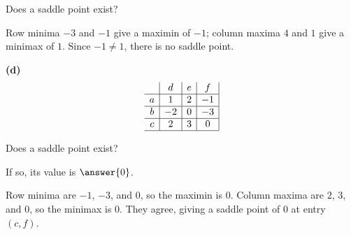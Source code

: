 \documentclass[12pt]{ximera}
\begin{document}
\begin{problem}
\begin{prompt}
Does a saddle point exist?
\begin{multipleChoice}
\end{multipleChoice}

\begin{solution}
Row minima $-3$ and $-1$ give a maximin of $-1$; column maxima $4$ and $1$ give a
minimax of $1$. Since $-1\neq 1$, there is no saddle point.
\end{solution}
\end{prompt}

\begin{prompt}
\textbf{(d)}
\[
\begin{array}{c|c|c|c|}
\phantom{|} & d & e & f \\\hline
a & 1 & 2 & -1 \\\hline
b & -2 & 0 & -3 \\\hline
c & 2 & 3 & 0 \\\hline
\end{array}
\]

Does a saddle point exist?
\begin{multipleChoice}
\end{multipleChoice}

If so, its value is $\answer{0}$.

\begin{solution}
Row minima are $-1$, $-3$, and $0$, so the maximin is $0$. Column maxima are $2$, $3$,
and $0$, so the minimax is $0$. They agree, giving a saddle point of $0$ at entry
$(c,f)$.
\end{solution}
\end{prompt}
\end{problem}
\end{document}
